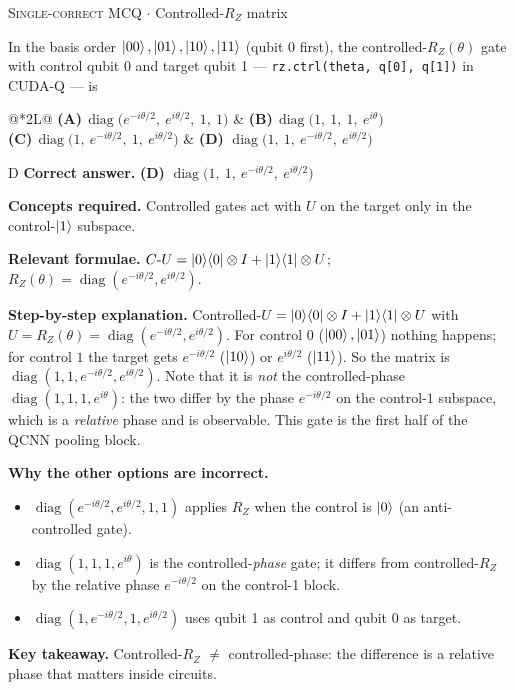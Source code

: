\documentclass[11pt,a4paper]{article}
\newcommand{\optlabel}[1]{\textbf{(#1)}}
\newcommand{\correctlabel}[1]{\textcolor{okgreen}{\textbf{(#1)}\,\ding{51}}}
\newenvironment{qitem}[1]{\begin{list}{}{\setlength{\leftmargin}{3.3em}\setlength{\labelwidth}{3.1em}%
  \setlength{\labelsep}{0.2em}\setlength{\topsep}{3pt}\setlength{\parsep}{3pt}}\item[\textbf{Q.#1}\hfill]}{\end{list}}
\newcommand{\qsep}{\par\vspace{2pt}{\color{black!15}\hrule}\vspace{4pt}}
\newcommand{\qmeta}[2]{{\footnotesize\color{black!60}\textsc{#1} \;$\cdot$\; #2}\par}
\begin{document}
\begin{qitem}{32}
\qmeta{Single-correct MCQ}{Controlled-$R_Z$ matrix}
In the basis order $\ket{00}, \ket{01}, \ket{10}, \ket{11}$ (qubit 0 first), the controlled-$R_Z(\theta)$ gate with
control qubit 0 and target qubit 1 --- \texttt{rz.ctrl(theta, q[0], q[1])} in CUDA-Q --- is
\par\smallskip\noindent\begin{tabularx}{\linewidth}{@{}*{2}{L}@{}}
\optlabel{A}\,$\operatorname{diag}\big(e^{-i\theta/2},\ e^{i\theta/2},\ 1,\ 1\big)$ & \optlabel{B}\,$\operatorname{diag}\big(1,\ 1,\ 1,\ e^{i\theta}\big)$ \\[3pt]
\optlabel{C}\,$\operatorname{diag}\big(1,\ e^{-i\theta/2},\ 1,\ e^{i\theta/2}\big)$ & \correctlabel{D}\,$\operatorname{diag}\big(1,\ 1,\ e^{-i\theta/2},\ e^{i\theta/2}\big)$
\end{tabularx}
\end{qitem}
\begin{solbox}{D}
\textbf{\color{brand}Correct answer.} \textcolor{okgreen}{\textbf{(D)}} $\operatorname{diag}\big(1,\ 1,\ e^{-i\theta/2},\ e^{i\theta/2}\big)$

\textbf{\color{brand}Concepts required.} Controlled gates act with $U$ on the target only in the control-$\ket1$ subspace.

\textbf{\color{brand}Relevant formulae.} $C\text{-}U = \ket0\!\bra0\otimes I + \ket1\!\bra1\otimes U$; $R_Z(\theta) = \operatorname{diag}(e^{-i\theta/2}, e^{i\theta/2})$.

\textbf{\color{brand}Step-by-step explanation.} Controlled-$U$ $= \ket0\!\bra0\otimes I + \ket1\!\bra1\otimes U$ with $U = R_Z(\theta) = \operatorname{diag}(e^{-i\theta/2}, e^{i\theta/2})$.
For control $0$ ($\ket{00}, \ket{01}$) nothing happens; for control $1$ the target gets $e^{-i\theta/2}$ ($\ket{10}$) or $e^{i\theta/2}$ ($\ket{11}$).
So the matrix is $\operatorname{diag}(1, 1, e^{-i\theta/2}, e^{i\theta/2})$. Note that it is \emph{not} the controlled-phase
$\operatorname{diag}(1,1,1,e^{i\theta})$: the two differ by the phase $e^{-i\theta/2}$ on the control-$1$ subspace, which is a
\emph{relative} phase and is observable. This gate is the first half of the QCNN pooling block.

\textbf{\color{brand}Why the other options are incorrect.}
\begin{itemize}[leftmargin=2.4em, itemsep=1pt, topsep=2pt]
\item[\textbf{(A)}] $\operatorname{diag}(e^{-i\theta/2}, e^{i\theta/2}, 1, 1)$ applies $R_Z$ when the control is $\ket0$ (an anti-controlled gate).
\item[\textbf{(B)}] $\operatorname{diag}(1, 1, 1, e^{i\theta})$ is the controlled-\emph{phase} gate; it differs from controlled-$R_Z$ by the relative phase $e^{-i\theta/2}$ on the control-1 block.
\item[\textbf{(C)}] $\operatorname{diag}(1, e^{-i\theta/2}, 1, e^{i\theta/2})$ uses qubit 1 as control and qubit 0 as target.
\end{itemize}
\textbf{\color{brand}Key takeaway.} Controlled-$R_Z$ $\neq$ controlled-phase: the difference is a relative phase that matters inside circuits.
\end{solbox}
\qsep
\end{document}
